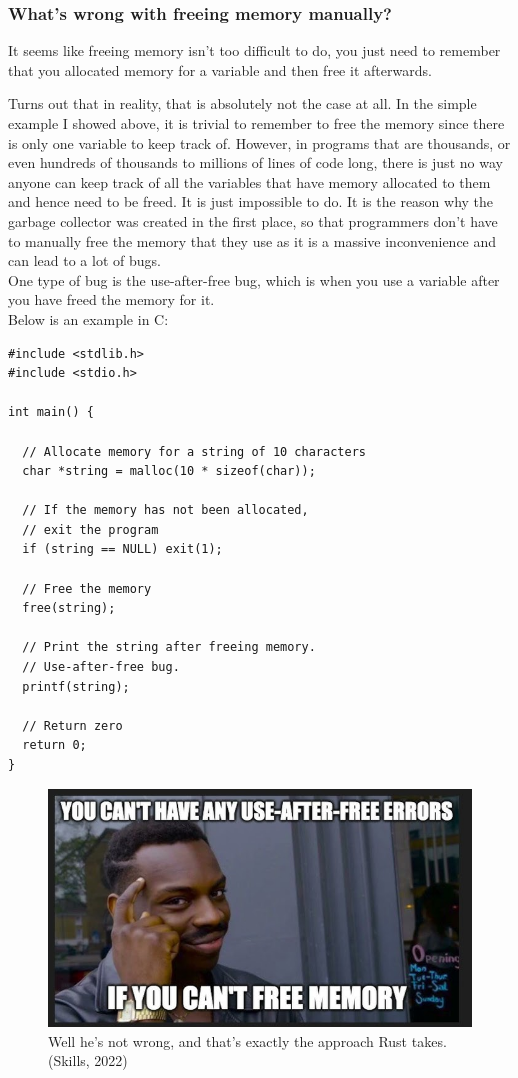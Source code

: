 \documentclass[11pt]{article}
\makeatletter
\newcommand{\citeprocitem}[2]{\hyper@linkstart{cite}{citeproc_bib_item_#1}#2\hyper@linkend}
\makeatother
\begin{document}
\subsubsection{What's wrong with freeing memory manually?}
\label{sec:orgf53904c}
It seems like freeing memory isn't too difficult to do,
you just need to remember that you allocated memory for
a variable and then free it afterwards.

 \newpage

Turns out that in reality, that is absolutely not the case at all.
In the simple example I showed above, it is trivial to remember
to free the memory since there is only one variable to keep track of.
However, in programs that are thousands, or even hundreds of thousands
to millions of lines of code long, there is just no way anyone
can keep track of all the variables that have memory allocated to them
and hence need to be freed. It is just impossible to do. It is the
reason why the garbage collector was created in the first place,
so that programmers don't have to manually free the memory that they use
as it is a massive inconvenience and can lead to a lot of bugs.  \\

One type of bug is the use-after-free bug, which is when you use
a variable after you have freed the memory for it.  \\

Below is an example in C:
\begin{verbatim}
#include <stdlib.h>
#include <stdio.h>

int main() {

  // Allocate memory for a string of 10 characters
  char *string = malloc(10 * sizeof(char));

  // If the memory has not been allocated,
  // exit the program
  if (string == NULL) exit(1);

  // Free the memory
  free(string);

  // Print the string after freeing memory.
  // Use-after-free bug.
  printf(string);

  // Return zero
  return 0;
}
\end{verbatim}

 \newpage

\begin{figure}[htbp]
\centering
\includegraphics[width=.9\linewidth]{./images/use-after-free-bugs.jpg}
\caption{Well he's not wrong, and that's exactly the approach Rust takes. (\citeprocitem{35}{Skills, 2022})}
\end{figure}
\end{document}
